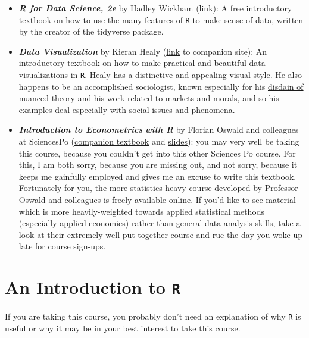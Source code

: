 \documentclass[
]{book}
\providecommand{\tightlist}{%
  \setlength{\itemsep}{0pt}\setlength{\parskip}{0pt}}
\begin{document}
\begin{itemize}
\tightlist
\item
  \textbf{\emph{R for Data Science, 2e}} by Hadley Wickham (\href{https://r4ds.hadley.nz/}{link}): A free introductory textbook on how to use the many features of \texttt{R} to make sense of data, written by the creator of the tidyverse package.
\item
  \textbf{\emph{Data Visualization}} by Kieran Healy (\href{https://socviz.co/}{link} to companion site): An introductory textbook on how to make practical and beautiful data visualizations in \texttt{R}. Healy has a distinctive and appealing visual style. He also happens to be an accomplished sociologist, known especially for his \href{https://kieranhealy.org/files/papers/fuck-nuance.pdf}{disdain of nuanced theory} and his \href{https://kieranhealy.org/publications/}{work} related to markets and morals, and so his examples deal especially with social issues and phenomena.
\item
  \textbf{\emph{Introduction to Econometrics}} \textbf{\emph{with R}} by Florian Oswald and colleagues at SciencesPo (\href{https://scpoecon.github.io/ScPoEconometrics/index.html}{companion textbook} and \href{https://github.com/ScPoEcon/ScPoEconometrics-Slides}{slides}): you may very well be taking this course, because you couldn't get into this other Sciences Po course. For this, I am both sorry, because you are missing out, and not sorry, because it keeps me gainfully employed and gives me an excuse to write this textbook. Fortunately for you, the more statistics-heavy course developed by Professor Oswald and colleagues is freely-available online. If you'd like to see material which is more heavily-weighted towards applied statistical methods (especially applied economics) rather than general data analysis skills, take a look at their extremely well put together course and rue the day you woke up late for course sign-ups.
\end{itemize}

\hypertarget{an-introduction-to-r}{%
\chapter{\texorpdfstring{An Introduction to \texttt{R}}{An Introduction to R}}\label{an-introduction-to-r}}

If you are taking this course, you probably don't need an explanation of why \texttt{R} is useful or why it may be in your best interest to take this course.
\end{document}

